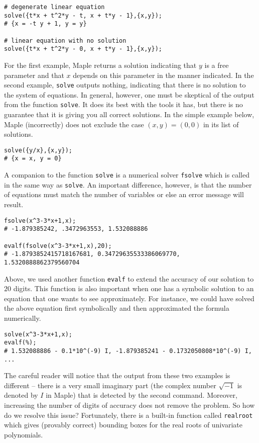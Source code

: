 \documentclass[12pt]{amsart}
\begin{document}
\begin{verbatim}
# degenerate linear equation
solve({t*x + t^2*y - t, x + t*y - 1},{x,y});
# {x = -t y + 1, y = y}

# linear equation with no solution
solve({t*x + t^2*y - 0, x + t*y - 1},{x,y});
\end{verbatim}

For the first example, Maple returns a solution indicating that $y$ is a free parameter and that
$x$ depends on this parameter in the manner indicated.  
In the second example, \texttt{solve} outputs nothing, indicating that there is no
solution to the system of equations.  In general, however, one must be skeptical of the
output from the function \texttt{solve}.  It does its best with the tools it has, but there is no
guarantee that it is giving you all correct solutions.  In the simple example below, Maple (incorrectly) does 
not exclude the case $(x,y) = (0,0)$ in its list of solutions.

\begin{verbatim}
solve({y/x},{x,y});
# {x = x, y = 0}
\end{verbatim}

A companion to the function \texttt{solve} is a numerical solver \texttt{fsolve} which is called in the
same way as  \texttt{solve}.  An important difference, however, is that the number of 
equations must match the number of variables or else an error message will result.

\begin{verbatim}
fsolve(x^3-3*x+1,x);
# -1.879385242, .3472963553, 1.532088886

evalf(fsolve(x^3-3*x+1,x),20);
# -1.8793852415718167681, 0.34729635533386069770, 1.5320888862379560704

\end{verbatim}

Above, we used another function \texttt{evalf} to extend the accuracy of our solution to 
$20$ digits.  This function is also important when one has a symbolic solution to an equation
that one wants to see approximately.  For instance, we could have solved the above 
equation first symbolically and then approximated the formula numerically.

\begin{verbatim}
solve(x^3-3*x+1,x);
evalf(%);
# 1.532088886 - 0.1*10^(-9) I, -1.879385241 - 0.1732050808*10^(-9) I, ...
\end{verbatim}

The careful reader will notice that the output from these two examples is different -- there is
a very small imaginary part (the complex number $\sqrt{-1}$ is denoted by $I$ in Maple)
that is detected by the second command.  Moreover, increasing
the number of digits of accuracy does not remove the problem.  So how do we resolve this issue?
Fortunately, there is a built-in function called \texttt{realroot} which gives (provably correct)
bounding boxes for the real roots of univariate polynomials.
\end{document}
